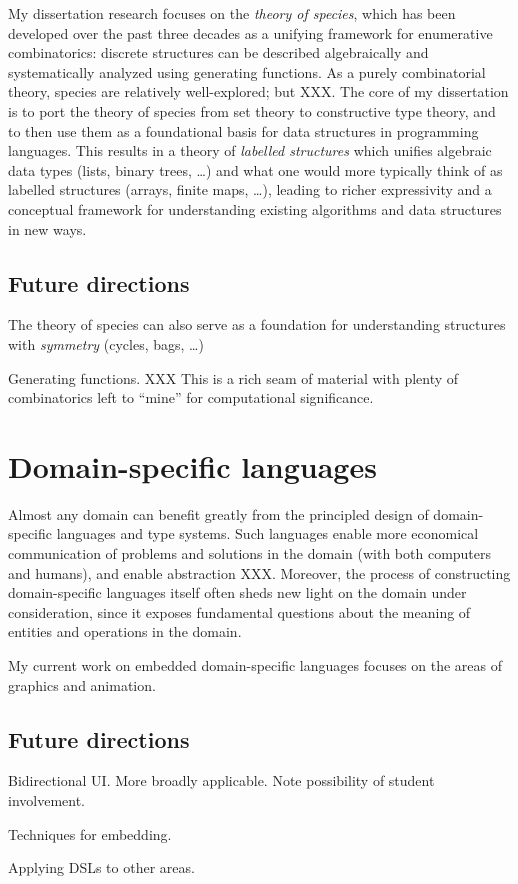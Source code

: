 \documentclass{article}
\begin{document}
My dissertation research focuses on the \emph{theory of species},
which has been developed over the past three decades as a unifying
framework for enumerative combinatorics: discrete structures can be
described algebraically and systematically analyzed using generating
functions.  As a purely combinatorial theory, species are relatively
well-explored; but XXX.  The core of my dissertation is to port the
theory of species from set theory to constructive type theory, and to
then use them as a foundational basis for data structures in
programming languages. This results in a theory of \emph{labelled
  structures} which unifies algebraic data types (lists, binary trees,
\dots) and what one would more typically think of as labelled
structures (arrays, finite maps, \dots), leading to richer
expressivity and a conceptual framework for understanding existing
algorithms and data structures in new ways.

\subsection*{Future directions}

 The
theory of species can also serve as a foundation for understanding
structures with \emph{symmetry} (cycles, bags, \dots)

Generating functions. XXX This is a rich seam of material with plenty
of combinatorics left to ``mine'' for computational significance.

\section*{Domain-specific languages}
\label{sec:edsls}

Almost any domain can benefit greatly from the principled design of
domain-specific languages and type systems.  Such languages enable
more economical communication of problems and solutions in the domain
(with both computers and humans), and enable abstraction XXX.
Moreover, the process of constructing domain-specific languages itself
often sheds new light on the domain under consideration, since it
exposes fundamental questions about the meaning of entities and
operations in the domain.

My current work on embedded domain-specific languages focuses on the
areas of graphics and animation.

\subsection*{Future directions}

Bidirectional UI.  More broadly applicable.  Note possibility of
student involvement.

Techniques for embedding.

Applying DSLs to other areas.
\end{document}
